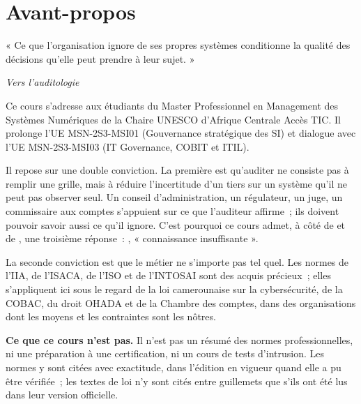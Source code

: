 
\chapter*{Avant-propos}

\epigraph{« Ce que l'organisation ignore de ses propres systèmes conditionne
la qualité des décisions qu'elle peut prendre à leur sujet. »}%
{\textit{Vers l'auditologie}~\cite{minka2026auditologie}}

Ce cours s'adresse aux étudiants du Master Professionnel en Management des
Systèmes Numériques de la Chaire UNESCO d'Afrique Centrale Accès TIC. Il
prolonge l'UE MSN-2S3-MSI01 (Gouvernance stratégique des SI) et dialogue
avec l'UE MSN-2S3-MSI03 (IT Governance, COBIT et ITIL).

Il repose sur une double conviction. La première est qu'auditer ne consiste
pas à remplir une grille, mais à réduire l'incertitude d'un tiers sur un
système qu'il ne peut pas observer seul. Un conseil d'administration, un
régulateur, un juge, un commissaire aux comptes s'appuient sur ce que
l'auditeur affirme~; ils doivent pouvoir savoir aussi ce qu'il ignore.
C'est pourquoi ce cours admet, à côté de \OUI{} et de \NON{}, une troisième
réponse~: \NEK{}, « connaissance insuffisante ».

La seconde conviction est que le métier ne s'importe pas tel quel. Les
normes de l'IIA, de l'ISACA, de l'ISO et de l'INTOSAI sont des acquis
précieux~; elles s'appliquent ici sous le regard de la loi camerounaise sur
la cybersécurité, de la COBAC, du droit OHADA et de la Chambre des comptes,
dans des organisations dont les moyens et les contraintes sont les nôtres.

\bigskip

\textbf{Ce que ce cours n'est pas.} Il n'est pas un résumé des normes
professionnelles, ni une préparation à une certification, ni un cours de
tests d'intrusion. Les normes y sont citées avec exactitude, dans l'édition
en vigueur quand elle a pu être vérifiée~; les textes de loi n'y sont
cités entre guillemets que s'ils ont été lus dans leur version officielle.

